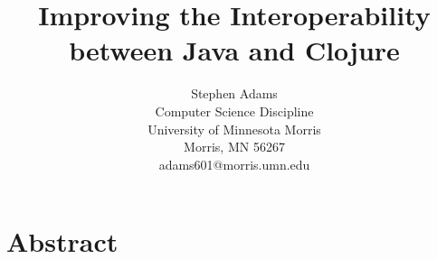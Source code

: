 \documentclass[12pt]{article}
\begin{document}
\pagestyle{plain}
%

\title{Improving the Interoperability between Java and Clojure}
%
%

\author{
Stephen Adams \\
Computer Science Discipline \\
University of Minnesota Morris\\
Morris, MN 56267\\
adams601@morris.umn.edu
}

\date{}

\maketitle
\thispagestyle{empty}

\section*{\centering Abstract}



\newpage
\setcounter{page}{1}
\end{document}
